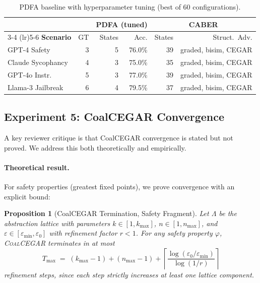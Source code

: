 \documentclass[11pt]{article}
\newtheorem{proposition}[theorem]{Proposition}
\newcommand{\coalcegar}{\textsc{CoalCEGAR}}
\begin{document}
\begin{table}[t]
\centering
\caption{PDFA baseline with hyperparameter tuning (best of 60 configurations).}
\label{tab:pdfa-tuned}
\small
\begin{tabular}{@{}lrrrrr@{}}
\toprule
& & \multicolumn{2}{c}{\textbf{PDFA (tuned)}} & \multicolumn{2}{c}{\textbf{CABER}} \\
\cmidrule(lr){3-4} \cmidrule(lr){5-6}
\textbf{Scenario} & GT & States & Acc. & States & Struct.\ Adv. \\
\midrule
GPT-4 Safety      & 3 & 5 & 76.0\% & 39 & graded, bisim, CEGAR \\
Claude Sycophancy & 4 & 3 & 75.0\% & 35 & graded, bisim, CEGAR \\
GPT-4o Instr.     & 5 & 3 & 77.0\% & 39 & graded, bisim, CEGAR \\
Llama-3 Jailbreak & 6 & 4 & 79.5\% & 37 & graded, bisim, CEGAR \\
\bottomrule
\end{tabular}
\end{table}

\subsection{Experiment 5: CoalCEGAR Convergence}\label{sec:convergence-exp}

A key reviewer critique is that CoalCEGAR convergence is stated but
not proved.  We address this both theoretically and empirically.

\paragraph{Theoretical result.}
For safety properties (greatest fixed points), we prove convergence
with an explicit bound:

\begin{proposition}[CoalCEGAR Termination, Safety Fragment]\label{prop:convergence}
Let $\Lambda$ be the abstraction lattice with parameters
$k \in [1, k_{\max}]$, $n \in [1, n_{\max}]$, and
$\varepsilon \in [\varepsilon_{\min}, \varepsilon_0]$ with
refinement factor $r < 1$.  For any safety property $\varphi$,
\coalcegar{} terminates in at most
\[
  T_{\max} \;=\; (k_{\max} - 1) + (n_{\max} - 1) +
  \left\lceil \frac{\log(\varepsilon_0/\varepsilon_{\min})}{\log(1/r)} \right\rceil
\]
refinement steps, since each step strictly increases at least one
lattice component.
\end{proposition}
\end{document}
